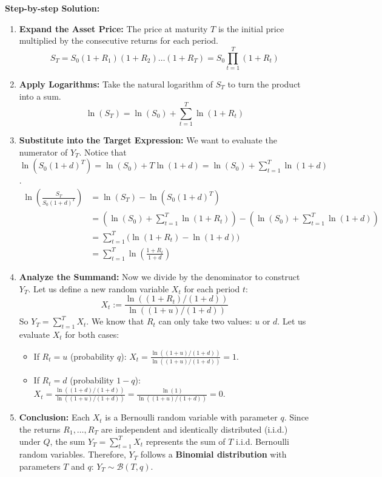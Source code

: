 \vspace{0.5cm}
\noindent \textbf{Step-by-step Solution:}
\begin{enumerate}
    \item \textbf{Expand the Asset Price:} The price at maturity $T$ is the initial price multiplied by the consecutive returns for each period.
    \begin{equation*}
        S_T = S_0 (1+R_1)(1+R_2)\dots(1+R_T) = S_0 \prod_{t=1}^T (1+R_t)
    \end{equation*}
    
    \item \textbf{Apply Logarithms:} Take the natural logarithm of $S_T$ to turn the product into a sum.
    \begin{equation*}
        \ln(S_T) = \ln(S_0) + \sum_{t=1}^T \ln(1+R_t)
    \end{equation*}
    
    \item \textbf{Substitute into the Target Expression:} We want to evaluate the numerator of $Y_T$. Notice that $\ln(S_0(1+d)^T) = \ln(S_0) + T\ln(1+d) = \ln(S_0) + \sum_{t=1}^T \ln(1+d)$.
    \begin{align*}
        \ln\left(\frac{S_T}{S_0(1+d)^T}\right) &= \ln(S_T) - \ln(S_0(1+d)^T) \\
        &= \left( \ln(S_0) + \sum_{t=1}^T \ln(1+R_t) \right) - \left( \ln(S_0) + \sum_{t=1}^T \ln(1+d) \right) \\
        &= \sum_{t=1}^T \big( \ln(1+R_t) - \ln(1+d) \big) \\
        &= \sum_{t=1}^T \ln\left(\frac{1+R_t}{1+d}\right)
    \end{align*}
    
    \item \textbf{Analyze the Summand:} Now we divide by the denominator to construct $Y_T$. Let us define a new random variable $X_t$ for each period $t$:
    \begin{equation*}
        X_t := \frac{\ln((1+R_t)/(1+d))}{\ln((1+u)/(1+d))}
    \end{equation*}
    So $Y_T = \sum_{t=1}^T X_t$. We know that $R_t$ can only take two values: $u$ or $d$. Let us evaluate $X_t$ for both cases:
    \begin{itemize}
        \item If $R_t = u$ (probability $q$): $X_t = \frac{\ln((1+u)/(1+d))}{\ln((1+u)/(1+d))} = 1$.
        \item If $R_t = d$ (probability $1-q$): $X_t = \frac{\ln((1+d)/(1+d))}{\ln((1+u)/(1+d))} = \frac{\ln(1)}{\ln((1+u)/(1+d))} = 0$.
    \end{itemize}
    
    \item \textbf{Conclusion:} Each $X_t$ is a Bernoulli random variable with parameter $q$. Since the returns $R_1, \dots, R_T$ are independent and identically distributed (i.i.d.) under $Q$, the sum $Y_T = \sum_{t=1}^T X_t$ represents the sum of $T$ i.i.d. Bernoulli random variables. Therefore, $Y_T$ follows a \textbf{Binomial distribution} with parameters $T$ and $q$: $Y_T \sim \mathcal{B}(T, q)$.
\end{enumerate}

